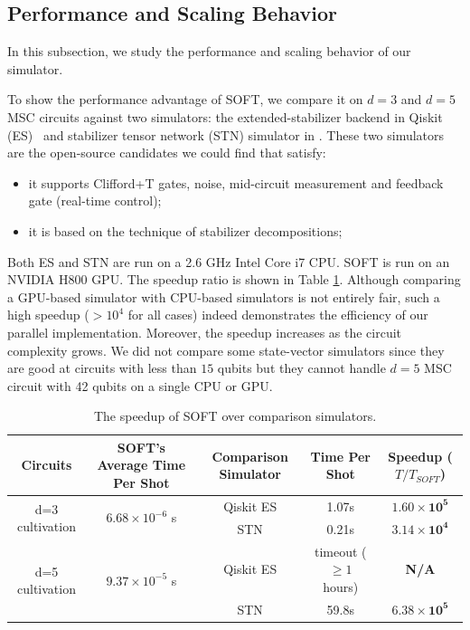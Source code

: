 \documentclass[10pt,conference]{IEEEtran}
\begin{document}
\subsection{Performance and Scaling Behavior}
\label{subsec:performance}
In this subsection, we study the performance and scaling behavior of our simulator.

{To show the performance advantage of SOFT, we compare it on $d=3$ and $d=5$ MSC circuits against two simulators: the extended-stabilizer backend in Qiskit (ES)~\cite{Qiskit_extend_stb, bravyi2019simulation} and stabilizer tensor network (STN) simulator in \cite{masot2024stn}. These two simulators are the open-source candidates we could find that satisfy:
\begin{itemize}
    \item it supports Clifford+T gates, noise, mid-circuit measurement and feedback gate (real-time control);
    \item it is based on the technique of stabilizer decompositions; 
\end{itemize}
Both ES and STN are run on a 2.6 GHz Intel Core i7 CPU. SOFT is run on an NVIDIA H800 GPU. The speedup ratio is shown in Table \ref{tab4}. Although comparing a GPU-based simulator with CPU-based simulators is not entirely fair, such a high speedup ($>10^{4}$ for all cases) indeed demonstrates the efficiency of our parallel implementation. Moreover, the speedup increases as the circuit complexity grows. We did not compare some state-vector simulators since they are good at circuits with less than $15$ qubits but they cannot handle $d=5$ MSC circuit with 42 qubits on a single CPU or GPU.}

\begin{table}
    \centering
    \caption{The speedup of SOFT over comparison simulators. }
    \label{tab4}
    \begin{tabular}{c|c|c|c|c}
        \hline
        Circuits & SOFT's Average Time Per Shot & Comparison Simulator & Time Per Shot & Speedup ($T/T_{SOFT}$)
        \\
        \hline
        \multirow{2}{*}{d=3 cultivation} & \multirow{2}{*}{$6.68\times10^{-6}$ s} & Qiskit ES & 1.07s  &  $\mathbf{1.60\times10^{5}}$ \\
        \cline{3-5}
        & & STN & 0.21s & $\mathbf{3.14\times10^{4}}$ \\
        \hline
        \multirow{2}{*}{d=5 cultivation} & \multirow{2}{*}{$9.37\times10^{-5}$ s} & Qiskit ES & timeout ($\geq 1$ hours)  &  \textbf{N/A} \\
        \cline{3-5}
         & & STN & 59.8s & $\mathbf{6.38\times10^5}$ \\
        \hline
    \end{tabular}
\end{table}
\end{document}
